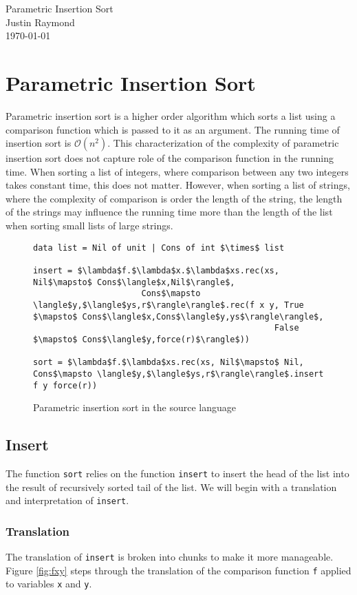 \documentclass[12pt,letterpaper]{article}
\newcommand{\T}[1]{\texttt{#1}}
\begin{document}
\begin{flushright}
Parametric Insertion Sort\\
Justin Raymond\\
\today
\end{flushright}

\section{Parametric Insertion Sort}
Parametric insertion sort is a higher order algorithm which sorts a list using a comparison function which is passed to it as an argument.
The running time of insertion sort is $\mathcal{O}(n^2)$.
This characterization of the complexity of parametric insertion sort does not capture role of the comparison function in the running time.
When sorting a list of integers, where comparison between any two integers takes constant time, this does not matter.
However, when sorting a list of strings, where the complexity of comparison is order the length of the string, the length of the strings may influence the running time more than the length of the list when sorting small lists of large strings.

\begin{figure}[H]
\caption{Parametric insertion sort in the source language}
\begin{lstlisting}
data list = Nil of unit | Cons of int $\times$ list

insert = $\lambda$f.$\lambda$x.$\lambda$xs.rec(xs, Nil$\mapsto$ Cons$\langle$x,Nil$\rangle$,
                      Cons$\mapsto \langle$y,$\langle$ys,r$\rangle\rangle$.rec(f x y, True $\mapsto$ Cons$\langle$x,Cons$\langle$y,ys$\rangle\rangle$,
                                                 False $\mapsto$ Cons$\langle$y,force(r)$\rangle$))

sort = $\lambda$f.$\lambda$xs.rec(xs, Nil$\mapsto$ Nil, Cons$\mapsto \langle$y,$\langle$ys,r$\rangle\rangle$.insert f y force(r))
\end{lstlisting}
\end{figure}

\subsection{Insert}
The function \T{sort} relies on the function \T{insert} to insert the head of the list into the result of recursively sorted tail of the list.
We will begin with a translation and interpretation of \T{insert}.

\subsubsection{Translation}
The translation of \T{insert} is broken into chunks to make it more manageable.
Figure \ref{fig:fxy} steps through the translation of the comparison function \T{f} applied to variables \T{x} and \T{y}.
\end{document}
